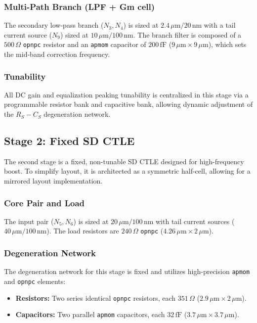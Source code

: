 \newpage
\subsubsection*{Multi-Path Branch (LPF + Gm cell)}
The secondary low-pass branch ($N_3, N_4$) is sized at $2.4\,\mu\text{m}/20\,\text{n}\text{m}$ with a tail current source ($N_9$) sized at $10\,\mu\text{m}/100\,\text{n}\text{m}$. The branch filter is composed of a $500\,\Omega$ \texttt{opnpc} resistor and an \texttt{apmom} capacitor of $200\,\text{fF}$ ($9\,\mu\text{m} \times 9\,\mu\text{m}$), which sets the mid-band correction frequency. 

\subsubsection{Tunability}
All DC gain and equalization peaking tunability is centralized in this stage via a programmable resistor bank and capacitive bank, allowing dynamic adjustment of the $R_S-C_S$ degeneration network.

\subsection*{Stage 2: Fixed SD CTLE}

The second stage is a fixed, non-tunable SD CTLE designed for high-frequency boost. To simplify layout, it is architected as a symmetric half-cell, allowing for a mirrored layout implementation.

\subsubsection*{Core Pair and Load}
The input pair ($N_5, N_6$) is sized at $20\,\mu\text{m}/100\,\text{n}\text{m}$ with tail current sources ($40\,\mu\text{m}/100\,\text{n}\text{m}$). The load resistors are $240\,\Omega$ \texttt{opnpc} ($4.26\,\mu\text{m} \times 2\,\mu\text{m}$).

\subsubsection*{Degeneration Network}
The degeneration network for this stage is fixed and utilizes high-precision \texttt{apmom} and \texttt{opnpc} elements:
\begin{itemize}[noitemsep]
    \item \textbf{Resistors:} Two series identical \texttt{opnpc} resistors, each $351\,\Omega$ ($2.9\,\mu\text{m} \times 2\,\mu\text{m}$).
    \item \textbf{Capacitors:} Two parallel \texttt{apmom} capacitors, each $32\,\text{fF}$ ($3.7\,\mu\text{m} \times 3.7\,\mu\text{m}$).
\end{itemize}
















